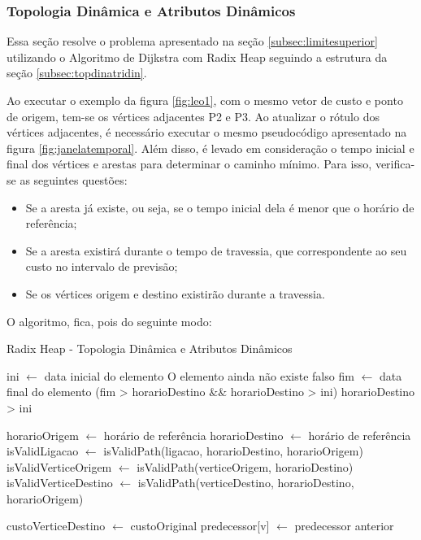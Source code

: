 \subsubsection{Topologia Dinâmica e Atributos Dinâmicos}
Essa seção resolve o problema apresentado na seção \ref{subsec:limitesuperior} utilizando o Algoritmo de
Dijkstra com Radix Heap seguindo a estrutura da seção \ref{subsec:topdinatridin}.

Ao executar o exemplo da figura \ref{fig:leo1}, com o mesmo vetor de custo e ponto de origem, tem-se
os vértices adjacentes P2 e P3. Ao atualizar o rótulo dos vértices adjacentes, é necessário executar o mesmo
pseudocódigo apresentado na figura \ref{fig:janelatemporal}. Além disso, é levado em consideração o tempo
inicial e final dos vértices e arestas para determinar o caminho mínimo. Para isso,
verifica-se as seguintes questões:
\begin{itemize}
\item Se a aresta já existe, ou seja, se o tempo inicial dela é menor que o horário de referência;
\item Se a aresta existirá durante o tempo de travessia, que correspondente ao seu custo no intervalo de previsão;
\item Se os vértices origem e destino existirão durante a travessia.
\end{itemize}
\FloatBarrier

O algoritmo, fica, pois do seguinte modo:

\begin{algorithm}
\caption{Radix Heap - Topologia Dinâmica e Atributos Dinâmicos}
\begin{algorithmic}[1]
\State ini $\leftarrow$ data inicial do elemento
  \State O elemento ainda não existe \Return falso
\EndIf
{}
  \State fim $\leftarrow$ data final do elemento
  \State\Return (fim > horarioDestino $\&\&$ horarioDestino > ini)
\EndIf
\Return horarioDestino > ini
\EndFunction

\State horarioOrigem $\leftarrow$ horário de referência
\State horarioDestino $\leftarrow$ horário de referência
\State isValidLigacao $\leftarrow$ isValidPath(ligacao, horarioDestino, horarioOrigem)
\State isValidVerticeOrigem $\leftarrow$ isValidPath(verticeOrigem, horarioDestino)
\State isValidVerticeDestino $\leftarrow$ isValidPath(verticeDestino, horarioDestino, horarioOrigem)

  \State custoVerticeDestino $\leftarrow$ custoOriginal
  \State predecessor[v] $\leftarrow$ predecessor anterior
\EndIf
\end{algorithmic}
\label{algtudodinamico}
\end{algorithm}
\FloatBarrier


